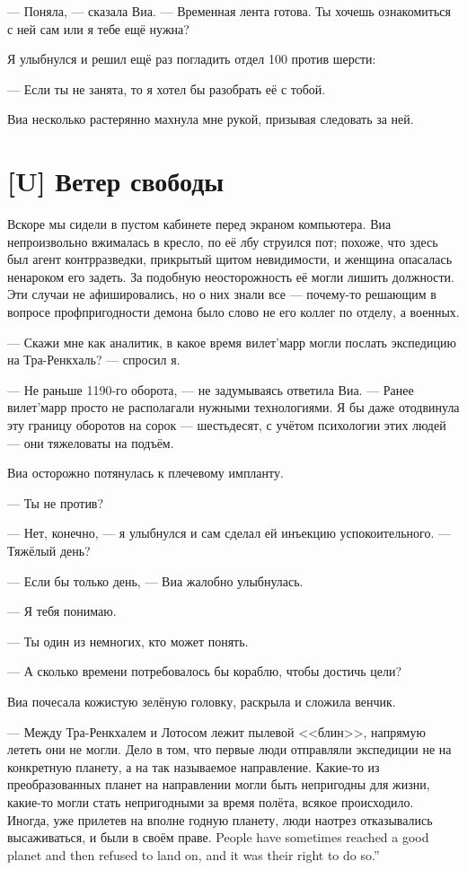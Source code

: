 --- Поняла, --- сказала Виа.
--- Временная лента готова.
Ты хочешь ознакомиться с ней сам или я тебе ещё нужна?

Я улыбнулся и решил ещё раз погладить отдел 100 против шерсти:

--- Если ты не занята, то я хотел бы разобрать её с тобой.

Виа несколько растерянно махнула мне рукой, призывая следовать за ней.

\section{[U] Ветер свободы}

Вскоре мы сидели в пустом кабинете перед экраном компьютера.
Виа непроизвольно вжималась в кресло, по её лбу струился пот;
похоже, что здесь был агент контрразведки, прикрытый щитом невидимости, и женщина опасалась ненароком его задеть.
За подобную неосторожность её могли лишить должности.
Эти случаи не афишировались, но о них знали все --- почему-то решающим в вопросе профпригодности демона было слово не его коллег по отделу, а военных.

--- Скажи мне как аналитик, в какое время вилет'марр могли послать экспедицию на Тра-Ренкхаль? --- спросил я.

--- Не раньше 1190-го оборота, --- не задумываясь ответила Виа.
--- Ранее вилет'марр просто не располагали нужными технологиями.
Я бы даже отодвинула эту границу оборотов на сорок --- шестьдесят, с учётом психологии этих людей --- они тяжеловаты на подъём.

Виа осторожно потянулась к плечевому импланту.

--- Ты не против?

--- Нет, конечно, --- я улыбнулся и сам сделал ей инъекцию успокоительного.
--- Тяжёлый день?

--- Если бы только день, --- Виа жалобно улыбнулась.

--- Я тебя понимаю.

--- Ты один из немногих, кто может понять.

--- А сколько времени потребовалось бы кораблю, чтобы достичь цели?

Виа почесала кожистую зелёную головку, раскрыла и сложила венчик.

--- Между Тра-Ренкхалем и Лотосом лежит пылевой <<блин>>, напрямую лететь они не могли.
Дело в том, что первые люди отправляли экспедиции не на конкретную планету, а на так называемое направление.
Какие-то из преобразованных планет на направлении могли быть непригодны для жизни, какие-то могли стать непригодными за время полёта, всякое происходило.
{Иногда, уже прилетев на вполне годную планету, люди наотрез отказывались высаживаться, и были в своём праве.}
{People have sometimes reached a good planet and then refused to land on, and it was their right to do so.''}

